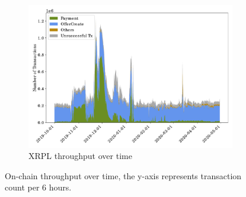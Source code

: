 \begin{figure}[tbp]
\begin{subfigure}{\columnwidth}
        \includegraphics[height=.27\textheight]{./4-transactions-security/figures/xrp-chart-area.pdf}
        \caption{XRPL throughput over time}
        \label{fig:xrp-throughput-time}
    \end{subfigure}
    \caption[On-chain throughput over time]{On-chain throughput over time, the y-axis represents transaction count per 6 hours.}
    \label{fig:throughput-time}
\end{figure}

